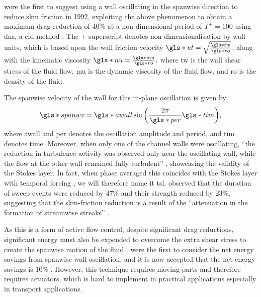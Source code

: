 \citeauthor*{jung1992} \cite{jung1992} were the first to suggest using a wall oscillating in the spanwise direction to reduce skin friction in 1992, exploiting the above phenomenon to obtain a maximum drag reduction of 40\% at a non-dimensional period of $T^+=100$ using \gls*{dns}, a \gls*{cfd} method \cite{karniadakis2003}. The $+$ superscript denotes non-dimensionalisation by wall units, which is based upon the wall friction velocity $\gls*{ut}=\sqrt{\frac{\gls*{tw}}{\gls*{ro}}}$, along with the kinematic viscosity $\gls*{nu}=\frac{\gls*{mu}}{\gls*{ro}},$ where \gls*{tw} is the wall shear stress of the fluid flow, \gls*{mu} is the dynamic viscosity of the fluid flow, and \gls*{ro} is the density of the fluid.

The spanwise velocity of the wall for this in-plane oscillation is given by
\begin{equation}
	\gls*{spanwv} = \gls*{awall}\sin{\left( \frac{2\pi}{\gls*{per}}\gls*{tim} \right)}
,\end{equation}
where \gls*{awall} and \gls*{per} denotes the oscillation amplitude and period, and \gls*{tim} denotes time.
Moreover, when only one of the channel walls were oscillating, ``the reduction in turbulence activity was observed only near the oscillating wall, while the flow at the other wall remained fully turbulent'' \cite{jung1992}, showcasing the validity of the Stokes layer. In fact, when phase averaged this coincides with the Stokes layer with temporal forcing \cite{viotti2009}, we will therefore name it \gls*{tsl}. \textcite{dhanak1999} observed that the duration of sweep events were reduced by 47\% and their strength reduced by 23\%, suggesting that the skin-friction reduction is a result of the ``attenuation in the formation of streamwise streaks'' \cite{karniadakis2003}.

As this is a form of active flow control, despite significant drag reductions, significant energy must also be expended to overcome the extra shear stress to create the spanwise motion of the fluid \cite{viotti2009}. \textcite{baron1996} were the first to consider the net energy savings from spanwise wall oscillation, and it is now accepted that the net energy savings is 10\% \cite{viotti2009, karniadakis2003}. However, this technique requires moving parts and therefore requires actuators, which is hard to implement in practical applications especially in transport applications.

